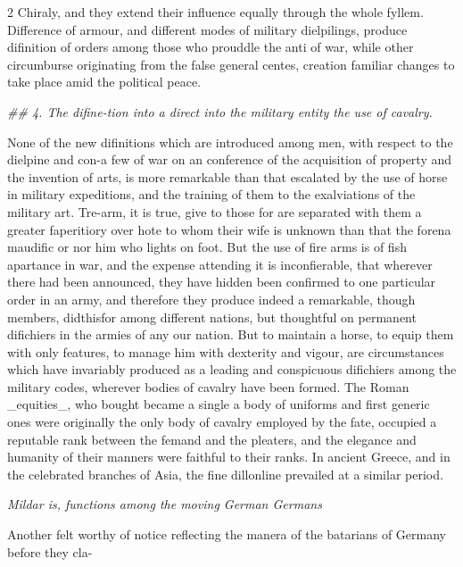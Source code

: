\documentclass[10pt]{article}
\begin{document}
\begin{multicols}{2}\raggedcolumns
Chiraly, and they extend their influence equally through the whole fyllem. Difference of armour, and different modes of military dielpilings, produce difinition of orders among those who prouddle the anti of war, while other circumburse originating from the false general centes, creation familiar changes to take place amid the political peace.

\begin{center}\small\itshape \#\# 4. The difine-tion into a direct into the military entity the use of cavalry.\end{center}
None of the new difinitions which are introduced among men, with respect to the dielpine and con-a few of war on an conference of the acquisition of property and the invention of arts, is more remarkable than that escalated by the use of horse in military expeditions, and the training of them to the exalviations of the military art. Tre-arm, it is true, give to those for are separated with them a greater faperitiory over hote to whom their wife is unknown than that the forena maudific or nor him who lights on foot. But the use of fire arms is of fish apartance in war, and the expense attending it is inconfierable, that wherever there had been announced, they have hidden been confirmed to one particular order in an army, and therefore they produce indeed a remarkable, though members, didthisfor among different nations, but thoughtful on permanent difichiers in the armies of any our nation. But to maintain a horse, to equip them with only features, to manage him with dexterity and vigour, are circumstances which have invariably produced as a leading and conspicuous difichiers among the military codes, wherever bodies of cavalry have been formed. The Roman \_equities\_, who bought became a single a body of uniforms and first generic ones were originally the only body of cavalry employed by the fate, occupied a reputable rank between the femand and the pleaters, and the elegance and humanity of their manners were faithful to their ranks. In ancient Greece, and in the celebrated branches of Asia, the fine dillonline prevailed at a similar period.

\begin{center}\small\itshape Mildar is, functions among the moving German Germans\end{center}
Another felt worthy of notice reflecting the manera of the batarians of Germany before they cla-


\end{multicols}
\end{document}
